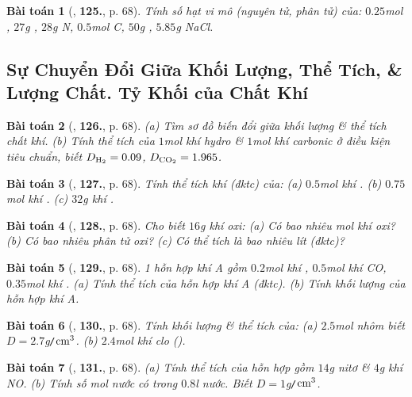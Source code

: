 \documentclass{article}
\numberwithin{equation}{section}
\newtheorem{baitoan}{Bài toán}
\begin{document}
\begin{baitoan}[\cite{An_400_BT_Hoa_Hoc_8_2020}, \textbf{125.}, p. 68]
	Tính số hạt vi mô (nguyên tử, phân tử) của: $0.25 $\emph{mol , $27$g , $28$g N, $0.5$mol C, $50$g , $5.85$g NaCl}.
\end{baitoan}

\subsection{Sự Chuyển Đổi Giữa Khối Lượng, Thể Tích, \& Lượng Chất. Tỷ Khối của Chất Khí}

\begin{baitoan}[\cite{An_400_BT_Hoa_Hoc_8_2020}, \textbf{126.}, p. 68]
	(a) Tìm sơ đồ biến đổi giữa khối lượng \& thể tích chất khí. (b) Tính thể tích của $1$\emph{mol} khí hydro \& $1$\emph{mol} khí carbonic ở điều kiện tiêu chuẩn, biết $D_{\ce{H2}} = 0.09$, $D_{\ce{CO2}} = 1.965$.
\end{baitoan}

\begin{baitoan}[\cite{An_400_BT_Hoa_Hoc_8_2020}, \textbf{127.}, p. 68]
	Tính thể tích khí (đktc) của: (a) $0.5$\emph{mol} khí \emph{}. (b) $0.75$\emph{mol} khí \emph{}. (c) $32$\emph{g} khí \emph{}.
\end{baitoan}

\begin{baitoan}[\cite{An_400_BT_Hoa_Hoc_8_2020}, \textbf{128.}, p. 68]
	Cho biết $16$\emph{g} khí oxi: (a) Có bao nhiêu mol khí oxi? (b) Có bao nhiêu phân tử oxi? (c) Có thể tích là bao nhiêu lít (đktc)?
\end{baitoan}

\begin{baitoan}[\cite{An_400_BT_Hoa_Hoc_8_2020}, \textbf{129.}, p. 68]
	1 hỗn hợp khí A gồm $0.2$\emph{mol} khí \emph{}, $0.5$\emph{mol} khí \emph{CO}, $0.35$\emph{mol} khí \emph{}. (a) Tính thể tích của hỗn hợp khí A (đktc). (b) Tính khối lượng của hỗn hợp khí A.
\end{baitoan}

\begin{baitoan}[\cite{An_400_BT_Hoa_Hoc_8_2020}, \textbf{130.}, p. 68]
	Tính khối lượng \& thể tích của: (a) $2.5$\emph{mol} nhôm biết $D = 2.7$\emph{g\texttt{/}$\rm cm^3$}. (b) $2.4$\emph{mol} khí clo (\emph{}).
\end{baitoan}

\begin{baitoan}[\cite{An_400_BT_Hoa_Hoc_8_2020}, \textbf{131.}, p. 68]
	(a) Tính thể tích của hỗn hợp gồm $14$\emph{g} nitơ \& $4$\emph{g} khí \emph{NO}. (b) Tính số mol nước \emph{} có trong $0.8$\emph{l} nước. Biết $D = 1$\emph{g\texttt{/}$\rm cm^3$}.
\end{baitoan}
\end{document}

